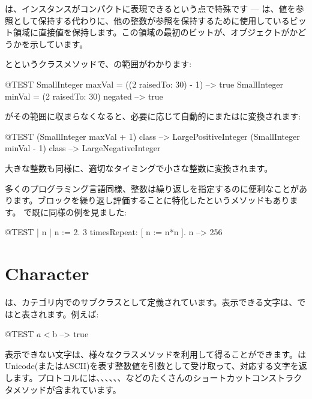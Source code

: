 \documentclass[a4paper,10pt,twoside]{book}
\begin{document}
は、インスタンスがコンパクトに表現できるという点で特殊です --- は、値を参照として保持する代わりに、他の整数が参照を保持するために使用しているビット領域に直接値を保持します。この領域の最初のビットが、オブジェクトがかどうかを示しています。

とというクラスメソッドで、の範囲がわかります:

\begin{code}{@TEST}
SmallInteger maxVal = ((2 raisedTo: 30) - 1)      --> true
SmallInteger minVal = (2 raisedTo: 30) negated --> true
\end{code}

がその範囲に収まらなくなると、必要に応じて自動的にまたはに変換されます:

\begin{code}{@TEST}
(SmallInteger maxVal + 1) class --> LargePositiveInteger
(SmallInteger minVal - 1) class  --> LargeNegativeInteger
\end{code}

大きな整数も同様に、適切なタイミングで小さな整数に変換されます。

多くのプログラミング言語同様、整数は繰り返しを指定するのに便利なことがあります。ブロックを繰り返し評価することに特化したというメソッドもあります。
で既に同様の例を見ました:
\begin{code}{@TEST | n |}
n := 2.
3 timesRepeat: [ n := n*n ].
n --> 256
\end{code}

\section{Character}

は、カテゴリ内でのサブクラスとして定義されています。表示できる文字は、\pharo ではと表されます。例えば:

\begin{code}{@TEST}
$a < $b --> true
\end{code}

表示できない文字は、様々なクラスメソッドを利用して得ることができます。\mbox{}はUnicode(またはASCII)を表す整数値を引数として受け取って、対応する文字を返します。プロトコルには、、、、、、などのたくさんのショートカットコンストラクタメソッドが含まれています。
\end{document}
